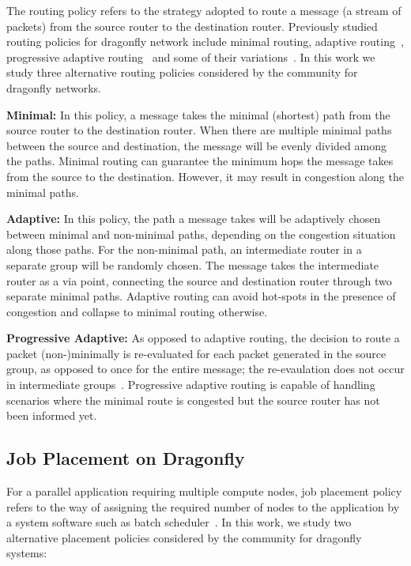 The routing policy refers to the strategy adopted to route a message (a stream of packets) from the source router to the destination router. Previously studied routing policies for dragonfly network include minimal routing, adaptive routing~\cite{dally-dragonfly}, progressive adaptive routing~\cite{jiang} and some of their variations~\cite{won-prog-adaptive}. In this work we study three alternative routing policies considered by the community for dragonfly networks.

\textbf{Minimal:} In this policy, a message takes the minimal (shortest) path from the source router to the destination router. When there are multiple minimal paths between the source and destination, the message will be evenly divided among the paths. Minimal routing can guarantee the minimum hops the message takes from the source to the destination. However, it may result in congestion along the minimal paths. 

\textbf{Adaptive:} In this policy, the path a message takes will be adaptively chosen between minimal and non-minimal paths, depending on the congestion situation along those paths. For the non-minimal path, an intermediate router in a separate group will be randomly chosen. The message takes the intermediate router as a via point, connecting the source and destination router through two separate minimal paths. Adaptive routing can avoid hot-spots in the presence of congestion and collapse to minimal routing otherwise. 

\textbf{Progressive Adaptive:} As opposed to adaptive routing, the decision to route a packet (non-)minimally is re-evaluated for each packet generated in the source group, as opposed to once for the entire message; the re-evaulation does not occur in intermediate groups~\cite{jiang}.
Progressive adaptive routing is capable of handling scenarios where the minimal route is congested but the source router has not been informed yet.

\subsection{Job Placement on Dragonfly}
\label{sec:placement-schemes}

For a parallel application requiring multiple compute nodes, job placement policy refers to the way of assigning the required number of nodes to the application by a system software such as batch scheduler~\cite{xu-cluster14}. In this work, we study two alternative placement policies considered by the community for dragonfly systems: 

